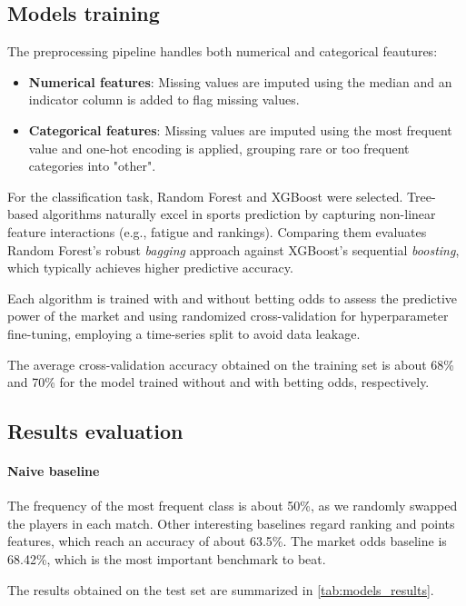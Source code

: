 \subsection*{Models training}

The preprocessing pipeline handles both numerical and categorical feautures:
\begin{itemize}
    \item \textbf{Numerical features}: Missing values are imputed using the median and an indicator column is added to flag missing values.
    \item \textbf{Categorical features}: Missing values are imputed using the most frequent value and one-hot encoding is applied, grouping rare or too frequent categories into "other".
\end{itemize}


For the classification task, Random Forest and XGBoost were selected. Tree-based algorithms naturally excel in sports prediction by capturing non-linear feature interactions (e.g., fatigue and rankings). Comparing them evaluates Random Forest's robust \textit{bagging} approach against XGBoost's sequential \textit{boosting}, which typically achieves higher predictive accuracy.

Each algorithm is trained with and without betting odds to assess the predictive power of the market and using randomized cross-validation for hyperparameter fine-tuning, employing a time-series split to avoid data leakage. 

The average cross-validation accuracy obtained on the training set is about 68\% and 70\% for the model trained without and with betting odds, respectively.

\subsection*{Results evaluation}

\paragraph{Naive baseline} The frequency of the most frequent class is about 50\%, as we randomly swapped the players in each match. Other interesting baselines regard ranking and points features, which reach an accuracy of about 63.5\%.
The market odds baseline is 68.42\%, which is the most important benchmark to beat.

The results obtained on the test set are summarized in \autoref{tab:models_results}.

